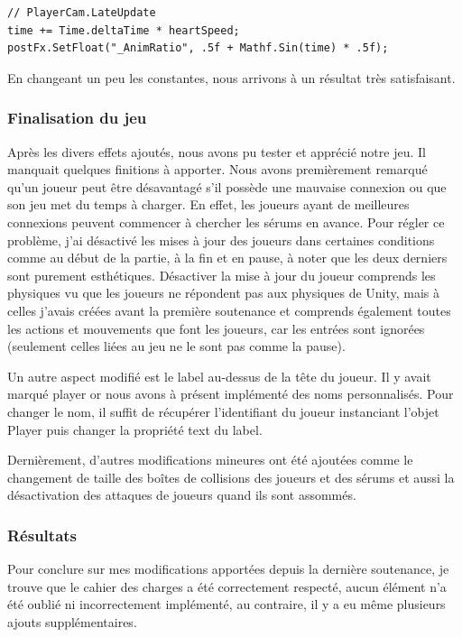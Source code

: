 \documentclass{article}
\begin{document}
\begin{lstlisting}
// PlayerCam.LateUpdate
time += Time.deltaTime * heartSpeed;
postFx.SetFloat("_AnimRatio", .5f + Mathf.Sin(time) * .5f);
\end{lstlisting}


En changeant un peu les constantes, nous arrivons à un résultat très satisfaisant.


\newpage
\subsubsection{Finalisation du jeu}


Après les divers effets ajoutés, nous avons pu tester et apprécié notre jeu. Il manquait quelques finitions à apporter.
Nous avons premièrement remarqué qu'un joueur peut être désavantagé s'il possède une mauvaise connexion ou que son jeu met du temps à charger. En effet, les joueurs ayant de meilleures connexions peuvent commencer à chercher les sérums en avance. Pour régler ce problème, j'ai désactivé les mises à jour des joueurs dans certaines conditions comme au début de la partie, à la fin et en pause, à noter que les deux derniers sont purement esthétiques. Désactiver la mise à jour du joueur comprends les physiques vu que les joueurs ne répondent pas aux physiques de Unity, mais à celles j'avais créées avant la première soutenance et comprends également toutes les actions et mouvements que font les joueurs, car les entrées sont ignorées (seulement celles liées au jeu ne le sont pas comme la pause).

Un autre aspect modifié est le label au-dessus de la tête du joueur. Il y avait marqué player or nous avons à présent implémenté des noms personnalisés. Pour changer le nom, il suffit de récupérer l'identifiant du joueur instanciant l'objet Player puis changer la propriété text du label.

Dernièrement, d'autres modifications mineures ont été ajoutées comme le changement de taille des boîtes de collisions des joueurs et des sérums et aussi la désactivation des attaques de joueurs quand ils sont assommés.


\subsubsection{Résultats}


Pour conclure sur mes modifications apportées depuis la dernière soutenance, je trouve que le cahier des charges a été correctement respecté, aucun élément n'a été oublié ni incorrectement implémenté, au contraire, il y a eu même plusieurs ajouts supplémentaires.
\end{document}
